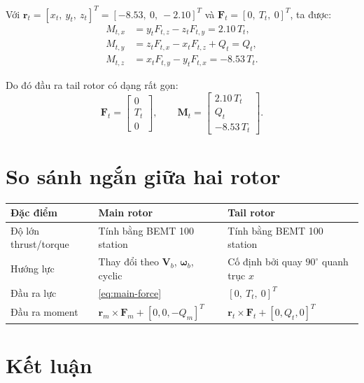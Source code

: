 \documentclass[11pt,a4paper]{article}
\newcommand{\vect}[1]{\boldsymbol{#1}}
\begin{document}
Với \(\vect{r}_t=[x_t,\ y_t,\ z_t]^T=[-8.53,\ 0,\ -2.10]^T\)
và \(\vect{F}_t=[0,\ T_t,\ 0]^T\), ta được:
\begin{align}
  M_{t,x} &= y_t F_{t,z} - z_t F_{t,y}
          = 2.10\,T_t, \\
  M_{t,y} &= z_t F_{t,x} - x_t F_{t,z} + Q_t
          = Q_t, \\
  M_{t,z} &= x_t F_{t,y} - y_t F_{t,x}
          = -8.53\,T_t.
\end{align}

Do đó đầu ra tail rotor có dạng rất gọn:
\begin{equation}
  \vect{F}_t =
  \begin{bmatrix}
    0 \\ T_t \\ 0
  \end{bmatrix},
  \qquad
  \vect{M}_t =
  \begin{bmatrix}
    2.10\,T_t \\
    Q_t \\
    -8.53\,T_t
  \end{bmatrix}.
  \label{eq:tail-final}
\end{equation}

\section{So sánh ngắn giữa hai rotor}

\begin{center}
\begin{tabular}{@{}p{3.2cm}p{5.2cm}p{5.2cm}@{}}
\toprule
Đặc điểm & Main rotor & Tail rotor \\
\midrule
Độ lớn thrust/torque & Tính bằng BEMT 100 station & Tính bằng BEMT 100 station \\
Hướng lực & Thay đổi theo \(\vect{V}_b\), \(\vect{\omega}_b\), cyclic & Cố định bởi quay \(90^\circ\) quanh trục \(x\) \\
Đầu ra lực & \eqref{eq:main-force} & \([0,\ T_t,\ 0]^T\) \\
Đầu ra moment & \(\vect{r}_m \times \vect{F}_m + [0,0,-Q_m]^T\) & \(\vect{r}_t \times \vect{F}_t + [0,Q_t,0]^T\) \\
\bottomrule
\end{tabular}
\end{center}

\section{Kết luận}
\end{document}
